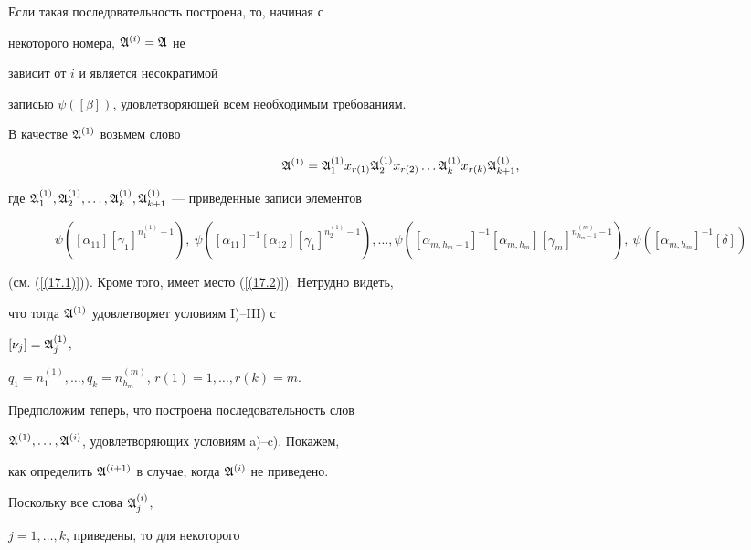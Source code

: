 Если такая последовательность построена, то, начиная с


некоторого номера, $\frak A^{(i)}=\frak A$ не


зависит от $i$ и является несократимой 


записью $\psi([\beta])$, удовлетворяющей всем необходимым требованиям.





В качестве $\frak A^{(1)}$ возьмем слово


$$


\frak A^{(1)}=\frak A^{(1)}_1 x_{r(1)}


\frak A^{(1)}_2 x_{r(2)} \dotsc\frak A^{(1)}_k x_{r(k)}


\frak A^{(1)}_{k+1},


$$


где $\frak A^{(1)}_1,\frak A^{(1)}_2,\dotsc,


\frak A^{(1)}_k,\frak A^{(1)}_{k+1}$ --- приведенные записи элементов


$$


\psi([\alpha_{11}][\gamma_1]^{n^{(1)}_1 -1}),


\ \psi([\alpha_{11}]^{-1}[\alpha_{12}][\gamma_1]^{n^{(1)}_2-1}),\dotsc,


\psi([\alpha_{m,h_m-1}]^{-1}[\alpha_{m,h_m}]


[\gamma_m]^{n^{(m)}_{h_m-1} -1}),\


\psi([\alpha_{m,h_m}]^{-1}[\delta])


$$


(см. (\ref{(17.1)})). Кроме того, имеет место (\ref{(17.2)}). Нетрудно видеть, 


что тогда $\frak A^{(1)}$ удовлетворяет условиям I)--III) с


$[\nu_j]=\frak A^{(1)}_j$,


$q_1=n^{(1)}_1,\dotsc,q_k=n^{(m)}_{h_m}$, $r(1)=1,\dotsc,r(k)=m$.





Предположим теперь, что построена последовательность слов


$\frak A^{(1)},\dotsc,\frak A^{(i)}$, удовлетворяющих условиям a)--c). Покажем,


как определить $\frak A^{(i+1)}$ в случае, когда $\frak A^{(i)}$ не приведено. 


Поскольку все слова $\frak A^{(i)}_j$,


$j=1,\dotsc,k$, приведены, то для некоторого


